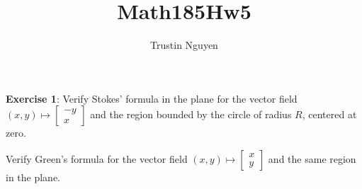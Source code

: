 \documentclass{article}
\title{Math185Hw5}
\author{Trustin Nguyen}
\begin{document}
    \maketitle

\reversemarginpar

\textbf{Exercise 1}: Verify Stokes' formula in the plane for the vector field $(x, y) \mapsto \begin{bmatrix}
    -y \\
    x    
\end{bmatrix}$ and the region bounded by the circle of radius $R$, centered at zero.

Verify Green's formula for the vector field $(x, y) \mapsto \begin{bmatrix}
    x \\
    y   
\end{bmatrix}$ and the same region in the plane.
\end{document}
